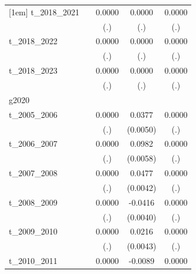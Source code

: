 \begin{table}[htbp]
\begin{tabular}{l*{4}{c}}
[1em]
t\_2018\_2021 &                     &      0.0000         &      0.0000         &      0.0000         \\
            &                     &         (.)         &         (.)         &         (.)         \\
[1em]
t\_2018\_2022 &                     &      0.0000         &      0.0000         &      0.0000         \\
            &                     &         (.)         &         (.)         &         (.)         \\
[1em]
t\_2018\_2023 &                     &      0.0000         &      0.0000         &      0.0000         \\
            &                     &         (.)         &         (.)         &         (.)         \\
\hline
g2020       &                     &                     &                     &                     \\
t\_2005\_2006 &                     &      0.0000         &      0.0377\sym{***}&      0.0000         \\
            &                     &         (.)         &    (0.0050)         &         (.)         \\
[1em]
t\_2006\_2007 &                     &      0.0000         &      0.0982\sym{***}&      0.0000         \\
            &                     &         (.)         &    (0.0058)         &         (.)         \\
[1em]
t\_2007\_2008 &                     &      0.0000         &      0.0477\sym{***}&      0.0000         \\
            &                     &         (.)         &    (0.0042)         &         (.)         \\
[1em]
t\_2008\_2009 &                     &      0.0000         &     -0.0416\sym{***}&      0.0000         \\
            &                     &         (.)         &    (0.0040)         &         (.)         \\
[1em]
t\_2009\_2010 &                     &      0.0000         &      0.0216\sym{***}&      0.0000         \\
            &                     &         (.)         &    (0.0043)         &         (.)         \\
[1em]
t\_2010\_2011 &                     &      0.0000         &     -0.0089\sym{**} &      0.0000         \\

\end{tabular}
\end{table}
